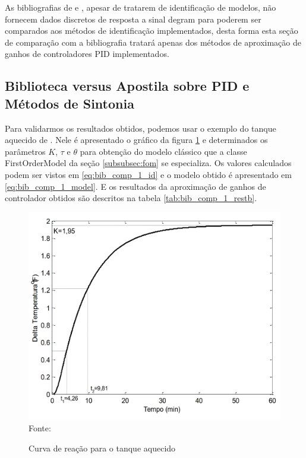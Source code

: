 As bibliografias de \cite{ogata2010engenharia} e \cite{CoelhoIdentificacao}, apesar de tratarem de identificação de
modelos, não fornecem dados discretos de resposta a sinal degram para poderem ser comparados aos métodos de
identificação implementados, desta forma esta seção de comparação com a bibliografia tratará apenas dos métodos de
aproximação de ganhos de controladores PID implementados.

\subsection{Biblioteca versus Apostila sobre PID e Métodos de Sintonia}

Para validarmos os resultados obtidos, podemos usar o exemplo do tanque aquecido de \cite{apostpidsint}.
Nele é apresentado o gráfico da figura \ref{fig:bib_comp_1_graph} e determinados os parâmetros $K$, $\tau$ e $\theta$ para
obtenção do modelo clássico que a classe FirstOrderModel da seção \ref{subsubsec:fom} se especializa.
Os valores calculados podem ser vistos em \ref{eq:bib_comp_1_id} e o modelo obtido é apresentado em
\ref{eq:bib_comp_1_model}.
E os resultados da aproximação de ganhos de controlador obtidos são descritos na tabela \ref{tab:bib_comp_1_restb}.


\begin{figure}[H]
    \centering
    \caption{Curva de reação para o tanque aquecido}
    \includegraphics[scale=0.4]{figuras/bib_comp_1_graph}
    \label{fig:bib_comp_1_graph}
    \\
    \vspace{0cm}\hspace{0cm}\small{Fonte: \cite{apostpidsint}}
\end{figure}

